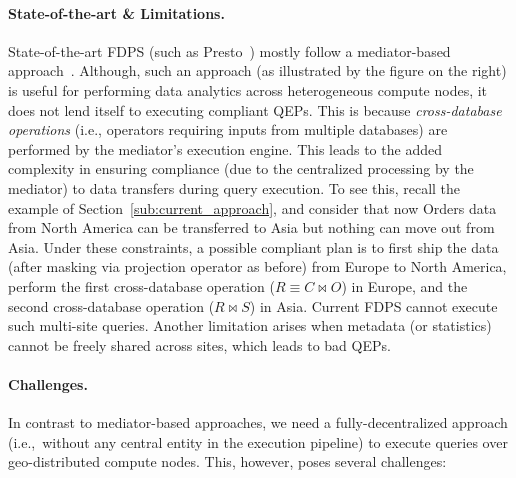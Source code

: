 \documentclass[11pt]{article}
\newcommand\join\Join
\begin{document}
\paragraph{State-of-the-art \& Limitations.}
State-of-the-art FDPS (such as Presto~\cite{presto}) mostly
follow a mediator-based
approach~\cite{Josifovski:2002:GNF:564691.564751}. Although,
such an approach (as illustrated by the figure on the right)
is useful for performing data analytics across heterogeneous
compute nodes, it does not lend itself to executing
compliant QEPs. This is because \emph{cross-database
operations} (i.e., operators requiring inputs from multiple
databases) are performed by the mediator's execution engine.
This leads to the added complexity in ensuring compliance
(due to the centralized processing by the mediator) to data
transfers during query execution. To see this, recall the
example of Section~\ref{sub:current_approach}, and consider
that now Orders data from North America can be transferred
to Asia but nothing can move out from Asia. Under these
constraints, a possible compliant plan is to first ship the
data (after masking via projection operator as before) from
Europe to North America, perform the first cross-database
operation ($R\equiv C\join O$) in Europe, and the second
cross-database operation ($R \join S$) in Asia. Current FDPS
cannot execute such multi-site queries. Another limitation
arises when metadata (or statistics) cannot be freely shared
across sites, which leads to bad QEPs.


\paragraph{Challenges.} In contrast to mediator-based
approaches, we need a fully-decentralized approach
(i.e.,~without any central entity in the execution pipeline)
to execute queries over geo-distributed compute nodes. This,
however, poses several challenges:
\end{document}
